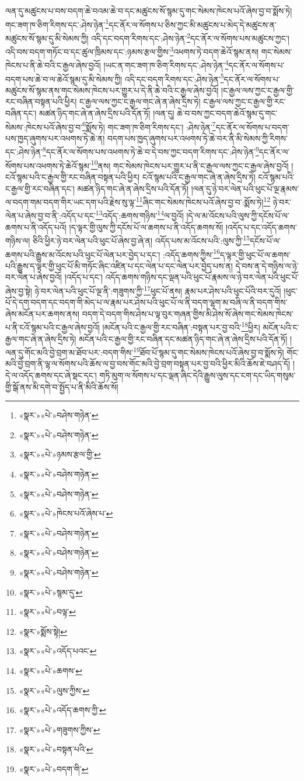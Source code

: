 ལན་དུ་མཚུངས་པ་བས་བདག་ཆེ་བའམ་ཆེ་བ་དང་མཚུངས་སོ་སྙམ་དུ་གང་སེམས་ཁེངས་པའོ་ཞེས་བྱ་བ་སྨོས་ཏེ། གང་ཟག་ཁ་ཅིག་རིགས་དང་:ཤེས་ཉེན་\footnote{«སྣར་»«པེ་»བཤེས་གཉེན་}དང་ནོར་ལ་སོགས་པ་ཅིས་ཀྱང་མི་མཚུངས་པ་མེད་དེ་མཚུངས་ན་མཚུངས་སོ་སྙམ་དུ་མི་སེམས་ཀྱི། འདི་དང་བདག་རིགས་དང་:ཤེས་ཉེན་\footnote{«སྣར་»«པེ་»བཤེས་གཉེན་}དང་ནོར་ལ་སོགས་པས་མཚུངས་ཀྱང་། འདི་བས་བདག་གཏོང་བ་དང་ཚུལ་ཁྲིམས་དང་:ཉམས་རྩལ་གྱིས་\footnote{«སྣར་»«པེ་»ཉམས་རྩལ་གྱི་}འཕགས་ཏེ་བདག་ཆེའོ་སྙམ་ནས། གང་སེམས་ཁེངས་པ་ནི་ཆེ་བའི་ང་རྒྱལ་ཞེས་བྱའོ། །ཡང་ན་གང་ཟག་ཁ་ཅིག་རིགས་དང་:ཤེས་ཉེན་\footnote{«སྣར་»«པེ་»བཤེས་གཉེན་}དང་ནོར་ལ་སོགས་པ་བདག་པས་ཆེ་བ་ལ་ཆེའོ་སྙམ་དུ་མི་སེམས་ཀྱི། འདི་དང་བདག་རིགས་དང་:ཤེས་ཉེན་\footnote{«སྣར་»«པེ་»བཤེས་གཉེན་}དང་ནོར་ལ་སོགས་པ་མཚུངས་སོ་སྙམ་ནས་གང་སེམས་ཁེངས་པར་གྱུར་པ་དེ་ནི་ཆེ་བའི་ང་རྒྱལ་ཞེས་བྱའོ། །ང་རྒྱལ་ལས་ཀྱང་ང་རྒྱལ་གྱི་རང་བཞིན་བསྟན་པའི་ཕྱིར། ང་རྒྱལ་ལས་ཀྱང་ང་རྒྱལ་གང་ཞེ་ན་ཞེས་དྲིས་ཏེ། ང་རྒྱལ་ལས་ཀྱང་ང་རྒྱལ་གྱི་རང་བཞིན་དང་། མཚན་ཉིད་གང་ཞེ་ན་ཞེས་དྲིས་པའི་དོན་ཏོ། །ལན་དུ། ཆེ་བ་བས་ཀྱང་བདག་ཆེའོ་སྙམ་དུ་གང་སེམས་:ཁེངས་པའོ་ཞེས་བྱ་བ་\footnote{«སྣར་»«པེ་»ཁེངས་པའོ་ཞེས་པ་}སྨོས་ཏེ། གང་ཟག་ཁ་ཅིག་རིགས་དང་། :ཤེས་ཉེན་\footnote{«སྣར་»«པེ་»བཤེས་གཉེན་}དང་ནོར་ལ་སོགས་པ་བདག་པས་ཁྱད་ཞུགས་པར་འཕགས་ཏེ་ཆེ་ན། བདག་པས་ཁྱད་ཞུགས་པར་འཕགས་ཏེ་ཆེ་བར་ནི་མི་སེམས་ཀྱི་རིགས་དང་:ཤེས་ཉེན་\footnote{«སྣར་»«པེ་»བཤེས་གཉེན་}དང་ནོར་ལ་སོགས་པས་འཕགས་ཏེ་ཆེ་བ་དེ་བས་ཀྱང་བདག་རིགས་དང་:ཤེས་ཉེན་\footnote{«སྣར་»«པེ་»བཤེས་གཉེན་}དང་ནོར་ལ་སོགས་པས་འཕགས་ཏེ་ཆེའོ་སྙམ་\footnote{«སྣར་»«པེ་»སྙམ་དུ་}ནས། གང་སེམས་ཁེངས་པར་གྱུར་པ་ནི་ང་རྒྱལ་ལས་ཀྱང་ང་རྒྱལ་ཞེས་བྱའོ། །ངའོ་སྙམ་པའི་ང་རྒྱལ་གྱི་རང་བཞིན་བསྟན་པའི་ཕྱིར། ངའོ་སྙམ་པའི་ང་རྒྱལ་གང་ཞེ་ན་ཞེས་དྲིས་ཏེ། ངའོ་སྙམ་པའི་ང་རྒྱལ་གྱི་རང་བཞིན་དང་། མཚན་ཉིད་གང་ཞེ་ན་ཞེས་དྲིས་པའི་དོན་ཏོ། །ལན་དུ་ཉེ་བར་ལེན་པའི་ཕུང་པོ་ལྔ་རྣམས་ལ་བདག་གམ་བདག་གིར་ཡང་དག་པའི་རྗེས་སུ་ལྟ་\footnote{«སྣར་»«པེ་»བལྟ་}ཞིང་གང་སེམས་ཁེངས་པའོ་ཞེས་བྱ་བ་:སྨོས་ཏེ།\footnote{«སྣར་»སྨོས་སྟེ།} ཉེ་བར་ལེན་པ་ཞེས་བྱ་བ་ནི་:འདོད་པ་དང་\footnote{«སྣར་»«པེ་»འདོད་པའང་}འདོད་:ཆགས་གཉིས་\footnote{«སྣར་»«པེ་»ཆགས་}ལ་བྱའོ། །དེ་ལ་མ་འོངས་པའི་ལུས་ཀྱི་དངོས་པོ་ལ་ཆགས་པ་ནི་འདོད་པའོ། །ད་ལྟར་གྱི་ལུས་ཀྱི་དངོས་པོ་ལ་ཆགས་པ་ནི་འདོད་ཆགས་སོ། །འདོད་པ་དང་འདོད་ཆགས་གཉིས་ལ། ཅིའི་ཕྱིར་ཉེ་བར་ལེན་པའི་ཕུང་པོ་ཞེས་བྱ་ཞེ་ན། འདོད་པས་མ་འོངས་པའི་:ལུས་ཀྱི་\footnote{«སྣར་»«པེ་»ལུས་ཀྱིས་}དངོས་པོ་ལ་ཆགས་པའི་རྒྱུས་མ་འོངས་པའི་ཕུང་པོ་ལེན་པར་བྱེད་པ་དང་། :འདོད་ཆགས་ཀྱིས་\footnote{«སྣར་»«པེ་»འདོད་ཆགས་ཀྱི་}ད་ལྟར་གྱི་ཕུང་པོ་ལ་ཆགས་པའི་རྒྱུས་ད་ལྟར་གྱི་ཕུང་པོ་མི་གཏོང་ཞིང་འཛིན་པ་དང་ལེན་པ་དང་ལེན་པར་བྱེད་པས་ན། དེ་བས་ན་དེ་གཉིས་ལ་ཉེ་བར་ལེན་པ་ཞེས་བྱའོ། །འདོད་པ་དང་། འདོད་ཆགས་གཉིས་དང་ལྡན་པའི་ཕུང་པོ་རྣམས་ལ་ཉེ་བར་ལེན་པའི་ཕུང་པོ་ཞེས་བྱ་སྟེ། ཉེ་བར་ལེན་པའི་ཕུང་པོ་ལྔ་ནི་:གཟུགས་ཀྱི་\footnote{«སྣར་»«པེ་»གཟུགས་ཀྱིས་}ཕུང་པོ་ནས། རྣམ་པར་ཤེས་པའི་ཕུང་པོའི་བར་དུའོ། །ཕུང་པོ་དེ་དག་བདག་དང་བདག་གི་མེད་པ་ལ་རྣམ་པར་ཤེས་པའི་ཕུང་པོ་ལ་ནི་བདག་ལྷག་མ་བཞི་ལ་ནི་བདག་གིས་ཞེས་མངོན་པར་ཆགས་ནས། བདག་དེ་བདག་གིས་ཤེས་པ་ལྟ་བུར་གཞན་གྱིས་མི་ཤེས་སོ་ཞེས་གང་སེམས་ཁེངས་པ་ནི་ངའོ་སྙམ་པའི་ང་རྒྱལ་ཞེས་བྱའོ། །མངོན་པའི་ང་རྒྱལ་གྱི་རང་བཞིན་:བསྟན་པར་བྱ་བའི་\footnote{«སྣར་»«པེ་»བསྟན་པའི་}ཕྱིར། མངོན་པའི་ང་རྒྱལ་གང་ཞེ་ན་ཞེས་དྲིས་ཏེ། མངོན་པའི་ང་རྒྱལ་གྱི་རང་བཞིན་དང་མཚན་ཉིད་གང་ཞེ་ན་ཞེས་དྲིས་པའི་དོན་ཏོ། །ལན་དུ་གོང་མའི་བྱེ་བྲག་མ་ཐོབ་པར་:བདག་གིས་\footnote{«སྣར་»«པེ་»བདག་གི་}ཐོབ་པོ་སྙམ་དུ་གང་སེམས་ཁེངས་པའོ་ཞེས་བྱ་བ་སྨོས་ཏེ། གོང་མའི་བྱེ་བྲག་ནི་ལྷ་ལ་སོགས་པའི་ཆོས་ལ་བྱ་བས་གོང་མའི་བྱེ་བྲག་བསྟན་པར་བྱ་བའི་ཕྱིར་མིའི་ཆོས་ཇེ་བཤད་དོ། །དེ་ལ་འདོད་ཆགས་དང་ཞེ་སྡང་དང་། གཏི་མུག་ལ་སོགས་པ་དང་ལྡན་ཞིང་དེའི་རྒྱུས་ལུས་དང་ངག་དང་ཡིད་གསུམ་གྱི་སྒོ་ནས་མི་དགེ་བ་སྤྱོད་པ་ནི་མིའི་ཆོས་སོ། 